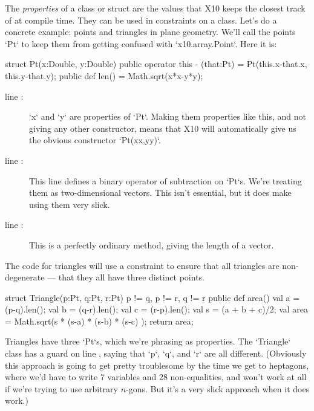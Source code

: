The {\em properties} of a class or struct are the values that X10 keeps the
closest track of at compile time.  They can be used in constraints on a class.
Let's do a concrete example: points and triangles in plane geometry.
We'll call the points \xcd`Pt` to keep them from getting confused with
\xcd`x10.array.Point`.  Here it is:
\begin{xtennum}[]
struct Pt(x:Double, y:Double) { 
  public operator this - (that:Pt) = Pt(this.x-that.x, this.y-that.y); 
  public def len() = Math.sqrt(x*x-y*y); 
}
\end{xtennum}

\begin{description}
\item [line :] \xcd`x` and \xcd`y` are properties of
      \xcd`Pt`.  
      Making them properties like this, and not giving any other constructor,
      means that X10 will automatically give us the obvious constructor
      \xcd`Pt(xx,yy)`. 
\item [line :] This line defines a binary operator of
      subtraction on \xcd`Pt`s.  We're treating them as two-dimensional
      vectors.   This isn't essential, but it does make using them very slick. 

\item [line :] This is a perfectly ordinary method,
      giving the length of a vector.
\end{description}

The code for triangles will use a constraint to ensure that all triangles are
non-degenerate --- that they all have three distinct points. 
\begin{xtennum}[]
struct Triangle(p:Pt, q:Pt, r:Pt) {p != q, p != r, q != r} {
  public def area() {
     val a = (p-q).len();
     val b = (q-r).len();
     val c = (r-p).len();
     val s = (a + b + c)/2;
     val area = Math.sqrt(s * (s-a) * (s-b) * (s-c) );
     return area;
  }
}
\end{xtennum}

Triangles have three \xcd`Pt`s, which we're phrasing as properties. The
\xcd`Triangle` class has a guard on line , saying
that \xcd`p`, \xcd`q`, and \xcd`r` are all different. (Obviously this approach
is going to get pretty troublesome by the time we get to heptagons, where we'd
have to write 7 variables and 28 non-equalities, and won't work at all if
we're trying to use arbitrary {$n$}-gons.  But it's a very slick approach when
it does work.)



